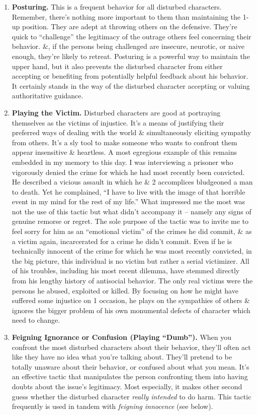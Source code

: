 \documentclass{article}
\numberwithin{equation}{section}
\begin{document}
\begin{enumerate}
	\item \textbf{Posturing.} This is a frequent behavior for all disturbed characters. Remember, there's nothing more important to them than maintaining the 1-up position. They are adept at throwing others on the defensive. They're quick to ``challenge'' the legitimacy of the outrage others feel concerning their behavior. \&, if the persons being challenged are insecure, neurotic, or naive enough, they're likely to retreat. Posturing is a powerful way to maintain the upper hand, but it also prevents the disturbed character from either accepting or benefiting from potentially helpful feedback about his behavior. It certainly stands in the way of the disturbed character accepting or valuing authoritative guidance.
	\item \textbf{Playing the Victim.} Disturbed characters are good at portraying themselves as the victims of injustice. It's a means of justifying their preferred ways of dealing with the world \& simultaneously eliciting sympathy from others. It's a sly tool to make someone who wants to confront them appear insensitive \& heartless. A most egregious example of this remains embedded in my memory to this day. I was interviewing a prisoner who vigorously denied the crime for which he had most recently been convicted. He described a vicious assault in which he \& 2 accomplices bludgeoned a man to death. Yet he complained, ``I have to live with the image of that horrible event in my mind for the rest of my life.'' What impressed me the most was not the use of this tactic but what didn't accompany it -- namely any signs of genuine remorse or regret. The sole purpose of the tactic was to invite me to feel sorry for him as an ``emotional victim'' of the crimes he did commit, \& as a victim again, incarcerated for a crime he didn't commit. Even if he is technically innocent of the crime for which he was most recently convicted, in the big picture, this individual is no victim but rather a serial victimizer. All of his troubles, including his most recent dilemma, have stemmed directly from his lengthy history of antisocial behavior. The only real victims were the persons he abused, exploited or killed. By focusing on how he might have suffered some injustice on 1 occasion, he plays on the sympathies of others \& ignores the bigger problem of his own monumental defects of character which need to change.
	\item \textbf{Feigning Ignorance or Confusion (Playing ``Dumb'').} When you confront the most disturbed characters about their behavior, they'll often act like they have no idea what you're talking about. They'll pretend to be totally unaware about their behavior, or confused about what you mean. It's an effective tactic that manipulates the person confronting them into having doubts about the issue's legitimacy. Most especially, it makes other second guess whether the disturbed character \textit{really intended} to do harm. This tactic frequently is used in tandem with \textit{feigning innocence} (see below).
	

\end{enumerate}
\end{document}

